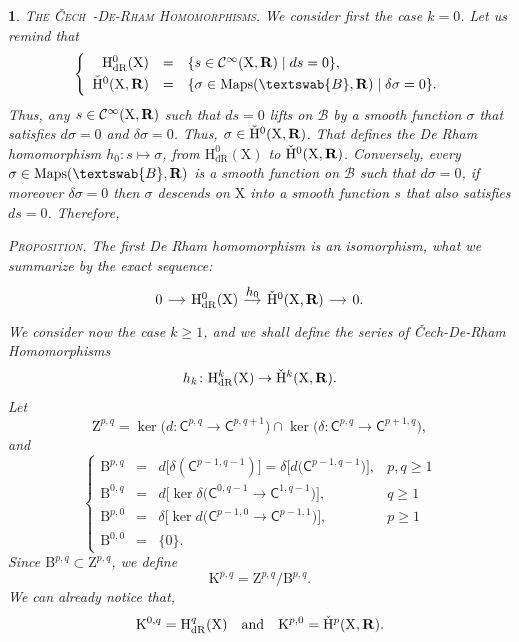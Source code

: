 \documentclass[12pt,reqno]{amsart}
\theoremstyle{article}
\newtheorem{article}{}
\def\artlabel[#1]{\textsc{#1}.}
\def \B{\mathrm B}
\def \H{\mathrm H}
\def \K{\mathrm K}
\def \X{\mathrm X}
\def \Z{\mathrm Z}
\newcommand{\RR}{{\bf R}}
\newcommand{\cB}{{\mathcal B}}
\newcommand{\fB}{\textswab{B}}
\newcommand{\sC}{\mathsf{C}}
\newcommand{\Cinfty}{{\mathcal C}^{\infty}}
\newcommand{\Cech}{\v{C}ech\ }
\newcommand{\dR}{\mathrm{dR}}
\DeclareMathOperator{\Maps}{Maps}
\newcommand{\vH}{\check{\mathrm{H}}}
\def \H{\mathrm H}
\begin{document}
  \begin{article}\artlabel[The \Cech-De-Rham Homomorphisms]
    We consider first the case $k=0$.
    Let us remind that
    $$
    \left\{
    \begin{array}{rcl}
      \H^0_\dR(\X)  & = &  \{ s \in \Cinfty(\X, \RR) \mid ds = 0 \}, \\[.5ex]
      \vH^0(\X,\RR) & = & \{ \sigma \in \Maps(\fB,\RR) \mid \delta \sigma = 0 \}.
    \end{array}
    \right.
    $$
    Thus,
    any $s \in \Cinfty(\X, \RR)$ such that $ds = 0$ lifts on $\cB$ by a smooth function $\sigma$ that satisfies $d\sigma = 0$ and $\delta\sigma = 0$.
    Thus,
    $\sigma \in \vH^0(\X,\RR)$.
    That defines the De Rham homomorphism $h_0 \colon s \mapsto \sigma$,
    from $\H^0_\dR(\X)$ to $\vH^0(\X,\RR)$.
    Conversely,
    every $\sigma \in \Maps(\fB,\RR)$ is a smooth function on $\cB$ such that $d\sigma = 0$,
    if moreover $\delta\sigma = 0$ then $\sigma$ descends on $\X$ into a smooth function $s$ that also satisfies $ds=0$.
    Therefore,
    
    \textsc{Proposition.} {\it The first De Rham homomorphism is an isomorphism,
    what we summarize by the exact sequence:
    $$
    \begin{tikzcd}[column sep=small,every label/.append style = {font = \small}]
      0 \arrow[r] & \H_\dR^0(\X) \arrow[r,"h_0"] & \vH^0(\X,\RR) \arrow[r] & 0.
    \end{tikzcd}
    $$
    }
    We consider now the case $k \geq 1$,
    and we shall define the series of \emph{\v{C}ech-De-Rham Homomorphisms}
    $$
    h_k \colon \H^k_\dR(\X) \to \vH^k(\X,\RR).
    $$
    Let
    $$
    \Z^{p,q} = \ker\big(d \colon \sC^{p,q}\to \sC^{p,q+1} \big) \cap \ker\big(\delta \colon \sC^{p,q} \to \sC^{p+1,q} \big),
    $$
    and
    $$
    \left\{
    \begin{array}{rcll}
      \B^{p,q} & = & d\big[\delta(\sC^{p-1,q-1}) \big] = \delta\big[d\big(\sC^{p-1,q-1}) \big], & p,q \geq 1 \\[.25cm]
      \B^{0,q} & = & d\big[\ker\delta\big(\sC^{0,q-1} \to \sC^{1,q-1}) \big], & q \geq 1 \\[.25cm]
      \B^{p,0} & = & \delta\big[\ker d\big(\sC^{p-1,0} \to \sC^{p-1,1})\big], & p \geq 1 \\[.25cm]
      \B^{0,0} & = & \{0\}.
    \end{array}\right.
    $$
    Since $\B^{p,q} \subset \Z^{p,q}$,
    we define
    $$
    \K^{p,q} = \Z^{p,q}/\B^{p,q}.
    $$
    We can already notice that,
    $$
    \K^{0,q} = \H_\dR^q(\X) \quad \text{and} \quad \K^{p,0} = \vH^p(\X,\RR).
    $$
    

\end{article}
\end{document}
